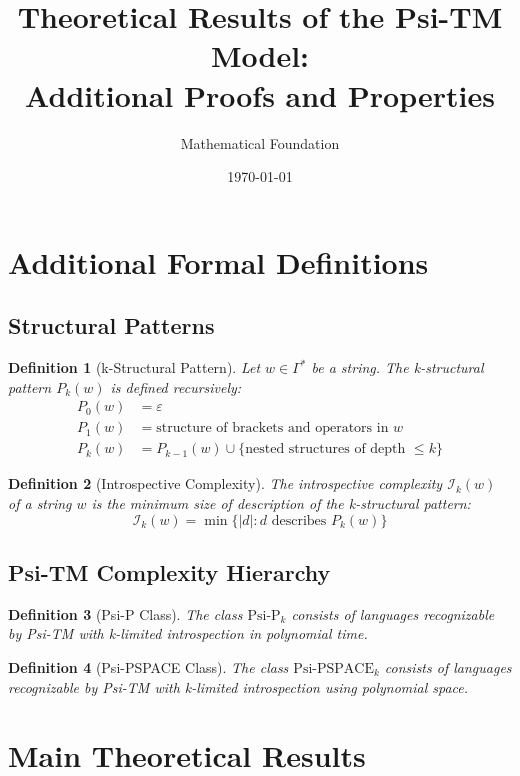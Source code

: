 \documentclass[11pt]{article}
\title{Theoretical Results of the Psi-TM Model:\\
Additional Proofs and Properties}
\author{Mathematical Foundation}
\date{\today}
\newtheorem{definition}{Definition}
\begin{document}
\maketitle

\section{Additional Formal Definitions}

\subsection{Structural Patterns}

\begin{definition}[k-Structural Pattern]
Let $w \in \Gamma^*$ be a string. The k-structural pattern $P_k(w)$ is defined recursively:
\begin{align*}
P_0(w) &= \varepsilon \\
P_1(w) &= \text{structure of brackets and operators in } w \\
P_k(w) &= P_{k-1}(w) \cup \{\text{nested structures of depth } \leq k\}
\end{align*}
\end{definition}

\begin{definition}[Introspective Complexity]
The introspective complexity $\mathcal{I}_k(w)$ of a string $w$ is the minimum size of description of the k-structural pattern:
$$\mathcal{I}_k(w) = \min\{|d| : d \text{ describes } P_k(w)\}$$
\end{definition}

\subsection{Psi-TM Complexity Hierarchy}

\begin{definition}[Psi-P Class]
The class $\text{Psi-P}_k$ consists of languages recognizable by Psi-TM with k-limited introspection in polynomial time.
\end{definition}

\begin{definition}[Psi-PSPACE Class]
The class $\text{Psi-PSPACE}_k$ consists of languages recognizable by Psi-TM with k-limited introspection using polynomial space.
\end{definition}

\section{Main Theoretical Results}
\end{document}
